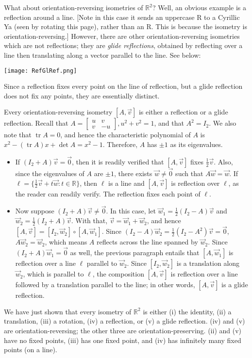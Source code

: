 \documentclass[leqno]{book}
\begin{document}
What about orientation-reversing isometries of $\mathbb R^2$?  Well, an obvious example is a reflection around a line.  [Note in this case it sends an uppercase R to a Cyrillic Ya (seen by rotating this page), rather than an R.  This is because the isometry is orientation-reversing.]  However, there are other orientation-reversing isometries which are not reflections; they are \emph{glide reflections}, obtained by reflecting over a line then translating along a vector parallel to the line.  See below:
\begin{center}\texttt{[image: RefGlRef.png]}\end{center}
Since a reflection fixes every point on the line of reflection, but a glide reflection does not fix any points, they are essentially distinct.

Every orientation-reversing isometry $[A,\vec v]$ is either a reflection or a glide reflection.  Recall that $A=\begin{bmatrix}u&v\\v&-u\end{bmatrix},u^2+v^2=1$, and that $A^2=I_2$.  We also note that $\operatorname{tr}A=0$, and hence the characteristic polynomial of $A$ is $x^2-(\operatorname{tr}A)x+\det A=x^2-1$.  Therefore, $A$ has $\pm 1$ as its eigenvalues.
\begin{itemize}
\item If $(I_2+A)\vec v=\vec 0$, then it is readily verified that $[A,\vec v]$ fixes $\frac 12\vec v$.  Also, since the eigenvalues of $A$ are $\pm 1$, there exists $\vec w\ne\vec 0$ such that $A\vec w=\vec w$.  If $\ell=\{\frac 12\vec v+t\vec w:t\in\mathbb R\}$, then $\ell$ is a line and $[A,\vec v]$ is reflection over $\ell$, as the reader can readily verify.  The reflection fixes each point of $\ell$.

\item Now suppose $(I_2+A)\vec v\ne\vec 0$.  In this case, let $\vec w_1=\frac 12(I_2-A)\vec v$ and $\vec w_2=\frac 12(I_2+A)\vec v$.  With that, $\vec v=\vec w_1+\vec w_2$, and hence $[A,\vec v]=[I_2,\vec w_2]\circ[A,\vec w_1]$.  Since $(I_2-A)\vec w_2=\frac 12(I_2-A^2)\vec v=\vec 0$, $A\vec w_2=\vec w_2$, which means $A$ reflects across the line spanned by $\vec w_2$.  Since $(I_2+A)\vec w_1=\vec 0$ as well, the previous paragraph entails that $[A,\vec w_1]$ is reflection over a line $\ell$ parallel to $\vec w_2$.  Since $[I_2,\vec w_2]$ is a translation along $\vec w_2$, which is parallel to $\ell$, the composition $[A,\vec v]$ is reflection over a line followed by a translation parallel to the line; in other words, $[A,\vec v]$ is a glide reflection.
\end{itemize}
\noindent We have just shown that every isometry of $\mathbb R^2$ is either (i) the identity, (ii) a translation, (iii) a rotation, (iv) a reflection, or (v) a glide reflection.  (iv) and (v) are orientation-reversing; the other three are orientation-preserving.  (ii) and (v) have no fixed points, (iii) has one fixed point, and (iv) has infinitely many fixed points (on a line).
\end{document}
